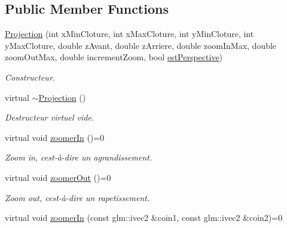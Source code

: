 \subsection*{Public Member Functions}
\begin{DoxyCompactItemize}
\item 
\hyperlink{classvue_1_1_projection_a27549dbc8ece7f5fdb3f7cd5d7a66fad}{Projection} (int x\+Min\+Cloture, int x\+Max\+Cloture, int y\+Min\+Cloture, int y\+Max\+Cloture, double z\+Avant, double z\+Arriere, double zoom\+In\+Max, double zoom\+Out\+Max, double increment\+Zoom, bool \hyperlink{classvue_1_1_projection_a3d9b70124ec0b3ed22299158abc4067c}{est\+Perspective})
\begin{DoxyCompactList}\small\item\em Constructeur. \end{DoxyCompactList}\item 
\hypertarget{classvue_1_1_projection_acb6551eb343f0b522c4994022a85b570}{}virtual \hyperlink{classvue_1_1_projection_acb6551eb343f0b522c4994022a85b570}{$\sim$\+Projection} ()\label{classvue_1_1_projection_acb6551eb343f0b522c4994022a85b570}

\begin{DoxyCompactList}\small\item\em Destructeur virtuel vide. \end{DoxyCompactList}\item 
\hypertarget{classvue_1_1_projection_ac3cd77fd93595b6844bd1b3b66867f55}{}virtual void \hyperlink{classvue_1_1_projection_ac3cd77fd93595b6844bd1b3b66867f55}{zoomer\+In} ()=0\label{classvue_1_1_projection_ac3cd77fd93595b6844bd1b3b66867f55}

\begin{DoxyCompactList}\small\item\em Zoom in, c\textquotesingle{}est-\/à-\/dire un agrandissement. \end{DoxyCompactList}\item 
\hypertarget{classvue_1_1_projection_a2f411375817ca560d31a66f2da5e51eb}{}virtual void \hyperlink{classvue_1_1_projection_a2f411375817ca560d31a66f2da5e51eb}{zoomer\+Out} ()=0\label{classvue_1_1_projection_a2f411375817ca560d31a66f2da5e51eb}

\begin{DoxyCompactList}\small\item\em Zoom out, c\textquotesingle{}est-\/à-\/dire un rapetissement. \end{DoxyCompactList}\item 
\hypertarget{classvue_1_1_projection_af6b1f66bfaa027815d9e7e7e6821ee8b}{}virtual void \hyperlink{classvue_1_1_projection_af6b1f66bfaa027815d9e7e7e6821ee8b}{zoomer\+In} (const glm\+::ivec2 \&coin1, const glm\+::ivec2 \&coin2)=0\label{classvue_1_1_projection_af6b1f66bfaa027815d9e7e7e6821ee8b}


\end{DoxyCompactItemize}
